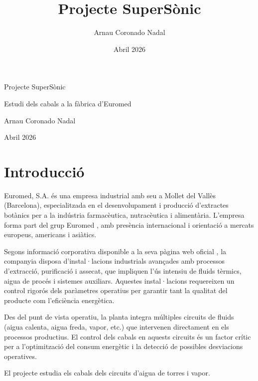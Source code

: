 \documentclass[11pt]{article}
\title{Projecte SuperSònic}
\author{Arnau Coronado Nadal}
\date{Abril 2026}
\begin{document}
\begin{center}
    \vspace*{3cm}

    {\Huge Projecte SuperSònic}

    \vspace{1cm}
    {\Large Estudi dels cabals a la fàbrica d'Euromed}

    \vspace{2cm}
    {\large Arnau Coronado Nadal}

    \vspace{1cm}
    {\normalsize Abril 2026}
\end{center}
\thispagestyle{emptystyle}
\newpage

\thispagestyle{emptystyle}
\renewcommand{\contentsname}{Taula de continguts}
\tableofcontents
\newpage


\section{Introducció}

Euromed, S.A. és una empresa industrial amb seu a Mollet del Vallès (Barcelona), especialitzada en el desenvolupament i producció d'extractes botànics per a la indústria farmacèutica, nutracèutica i alimentària. L'empresa forma part del grup Euromed \cite{Euromed2024}, amb presència internacional i orientació a mercats europeus, americans i asiàtics.

Segons informació corporativa disponible a la seva pàgina web oficial \cite{Euromed2024}, la companyia disposa d'instal·lacions industrials avançades amb processos d'extracció, purificació i assecat, que impliquen l'ús intensiu de fluids tèrmics, aigua de procés i sistemes auxiliars. Aquestes instal·lacions requereixen un control rigorós dels paràmetres operatius per garantir tant la qualitat del producte com l'eficiència energètica.

Des del punt de vista operatiu, la planta integra múltiples circuits de fluids (aigua calenta, aigua freda, vapor, etc.) que intervenen directament en els processos productius. El control dels cabals en aquests circuits és un factor crític per a l'optimització del consum energètic i la detecció de possibles desviacions operatives.

El projecte estudia els cabals dels circuits d'aigua de torres i vapor.
\end{document}
